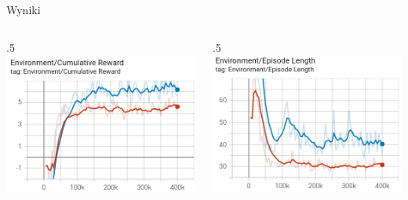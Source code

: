 \begin{frame}{Wyniki}
	\begin{columns}
		\begin{column}{.5\hsize}
			\includegraphics[width=\linewidth]{figures/compare_res_1_rewards.png}
		\end{column}
		\begin{column}{.5\hsize}
			\includegraphics[width=\linewidth]{figures/compare_res_1_length.png}
		\end{column}
	\end{columns}
	
\end{frame}
